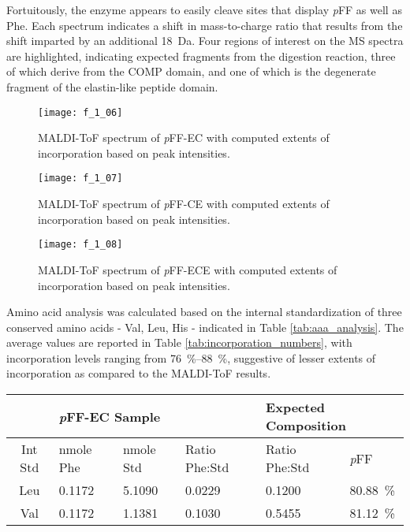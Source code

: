 \begin{refsection}
Fortuitously, the enzyme appears to easily cleave sites that display \emph{p}FF
as well as Phe. Each spectrum indicates a shift in mass-to-charge ratio that
results from the shift imparted by an additional \SI{18}{\dalton}. Four regions
of interest on the MS spectra are highlighted, indicating expected fragments
from the digestion reaction, three of which derive from the COMP domain, and one
of which is the degenerate fragment of the elastin-like peptide domain.
\begin{figure}[h!] \centering \texttt{[image: f\_1\_06]}
    \caption{MALDI-ToF spectrum of \emph{p}FF-EC with computed extents of
incorporation based on peak intensities.} \label{fig:MALDI_spectrum_EC} \end{figure}
\begin{figure}[h!] \centering \texttt{[image: f\_1\_07]}
    \caption{MALDI-ToF spectrum of \emph{p}FF-CE with computed extents of
incorporation based on peak intensities.} \label{fig:MALDI_spectrum_CE} \end{figure}
\begin{figure}[h!] \centering \texttt{[image: f\_1\_08]}
    \caption{MALDI-ToF spectrum of \emph{p}FF-ECE with computed extents of
incorporation based on peak intensities.} \label{fig:MALDI_spectrum_ECE} \end{figure}
Amino acid analysis was calculated based on the internal standardization of
three conserved amino acids - Val, Leu, His - indicated in Table
\ref{tab:aaa_analysis}. The average values are reported in
Table \ref{tab:incorporation_numbers}, with incorporation levels ranging from
\SIrange{76}{88}{\percent}, suggestive of lesser extents of incorporation as
compared to the MALDI-ToF results. 
\begin{table}[h!]
    \centering
\begin{tabular}{ clllll }
  \hline
  &
  \multicolumn{3}{l}{\emph{p}FF-EC Sample} &
  \multicolumn{2}{l}{Expected Composition} \\
  \hline
  Int Std & nmole Phe & nmole Std & Ratio Phe:Std & Ratio Phe:Std& \emph{p}FF \\
  Leu & 0.1172 & 5.1090 & 0.0229 & 0.1200 & \SI{80.88}{\percent} \\
  Val & 0.1172 & 1.1381 & 0.1030 & 0.5455 & \SI{81.12}{\percent} \\

\end{tabular}
\end{table}
\end{refsection}
